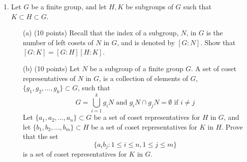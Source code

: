\documentclass[11pt]{article}
\begin{document}
\begin{enumerate}
\item Let $G$ be a finite group, and let $H, K$ be subgroups of $G$ such that $K\subset H\subset G$. 

\begin{enumerate} \item[(a)] (10 points) Recall that the index of a subgroup, $N$, in $G$ is the number of left cosets of $N$ in $G$, and is denoted by $[G:N]$. Show that $[G:K] = [G:H][H:K]$.

\pagebreak

\item[(b)] (10 points) Let $N$ be a subgroup of a finite group $G$. A set of coset representatives of $N$ in $G$, is a collection of elements of $G$, $\{g_1,g_2,\ldots, g_k\}\subset G$, such that
$$G = \bigcup_{i = 1}^k g_i N \text{ and } g_iN\cap g_jN=\emptyset\text{ if }i\not=j$$
Let $\{a_1,a_2,\ldots, a_n\}\subset G$ be a set of coset representatives for $H$ in $G$, and let $\{b_1,b_2,\ldots, b_m\}\subset H$ be a set of coset representatives for $K$ in $H$. Prove that the set 
$$\{a_ib_j : 1\leq i\leq n, 1\leq j\leq m\}$$
is a set of coset representatives for $K$ in $G$.
\pagebreak
\end{enumerate}


\end{enumerate}
\end{document}
